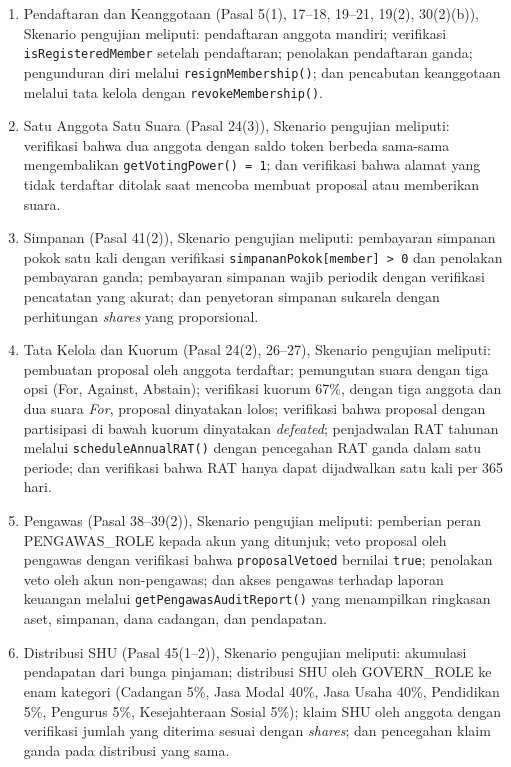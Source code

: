 \begin{enumerate}
	\item Pendaftaran dan Keanggotaan (Pasal 5(1), 17--18, 19--21, 19(2), 30(2)(b)), Skenario pengujian meliputi: pendaftaran anggota mandiri; verifikasi \texttt{isRegisteredMember} setelah pendaftaran; penolakan pendaftaran ganda; pengunduran diri melalui \texttt{resignMembership()}; dan pencabutan keanggotaan melalui tata kelola dengan \texttt{revokeMembership()}.
	
	\item Satu Anggota Satu Suara (Pasal 24(3)), Skenario pengujian meliputi: verifikasi bahwa dua anggota dengan saldo token berbeda sama-sama mengembalikan \texttt{getVotingPower() = 1}; dan verifikasi bahwa alamat yang tidak terdaftar ditolak saat mencoba membuat proposal atau memberikan suara.
	
	\item Simpanan (Pasal 41(2)), Skenario pengujian meliputi: pembayaran simpanan pokok satu kali dengan verifikasi \texttt{simpananPokok[member] > 0} dan penolakan pembayaran ganda; pembayaran simpanan wajib periodik dengan verifikasi pencatatan yang akurat; dan penyetoran simpanan sukarela dengan perhitungan \textit{shares} yang proporsional.
	
	\item Tata Kelola dan Kuorum (Pasal 24(2), 26--27), Skenario pengujian meliputi: pembuatan proposal oleh anggota terdaftar; pemungutan suara dengan tiga opsi (For, Against, Abstain); verifikasi kuorum 67\%, dengan tiga anggota dan dua suara \textit{For}, proposal dinyatakan lolos; verifikasi bahwa proposal dengan partisipasi di bawah kuorum dinyatakan \textit{defeated}; penjadwalan RAT tahunan melalui \texttt{scheduleAnnualRAT()} dengan pencegahan RAT ganda dalam satu periode; dan verifikasi bahwa RAT hanya dapat dijadwalkan satu kali per 365 hari.
	
	\item Pengawas (Pasal 38--39(2)), Skenario pengujian meliputi: pemberian peran PENGAWAS\_ROLE kepada akun yang ditunjuk; veto proposal oleh pengawas dengan verifikasi bahwa \texttt{proposalVetoed} bernilai \texttt{true}; penolakan veto oleh akun non-pengawas; dan akses pengawas terhadap laporan keuangan melalui \texttt{getPengawasAuditReport()} yang menampilkan ringkasan aset, simpanan, dana cadangan, dan pendapatan.
	
	\item Distribusi SHU (Pasal 45(1--2)), Skenario pengujian meliputi: akumulasi pendapatan dari bunga pinjaman; distribusi SHU oleh GOVERN\_ROLE ke enam kategori (Cadangan 5\%, Jasa Modal 40\%, Jasa Usaha 40\%, Pendidikan 5\%, Pengurus 5\%, Kesejahteraan Sosial 5\%); klaim SHU oleh anggota dengan verifikasi jumlah yang diterima sesuai dengan \textit{shares}; dan pencegahan klaim ganda pada distribusi yang sama.
	

\end{enumerate}
